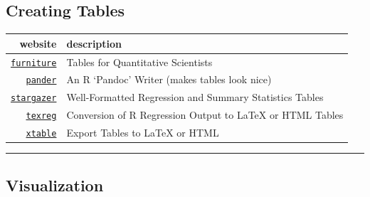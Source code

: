 \documentclass[]{book}
\theoremstyle{definition}
\theoremstyle{definition}
\theoremstyle{definition}
\theoremstyle{remark}
\begin{document}
\subsection{Creating Tables}\label{creating-tables}

\begin{longtable}[]{@{}rl@{}}
\toprule
website & description\tabularnewline
\midrule
\endhead
\href{http://tysonbarrett.com/furniture/}{\texttt{furniture}} & Tables
for Quantitative Scientists\tabularnewline
\href{https://rapporter.github.io/pander/}{\texttt{pander}} & An R
`Pandoc' Writer (makes tables look nice)\tabularnewline
\href{https://www.jakeruss.com/cheatsheets/stargazer/}{\texttt{stargazer}}
& Well-Formatted Regression and Summary Statistics Tables\tabularnewline
\href{https://diffuseprior.wordpress.com/2013/01/20/texreg-a-package-for-beautiful-and-easily-customizable-latex-regression-tables-from-r/}{\texttt{texreg}}
& Conversion of R Regression Output to LaTeX or HTML
Tables\tabularnewline
\href{https://cran.r-project.org/web/packages/xtable/vignettes/xtableGallery.pdf}{\texttt{xtable}}
& Export Tables to LaTeX or HTML\tabularnewline
\bottomrule
\end{longtable}

\begin{center}\rule{0.5\linewidth}{\linethickness}\end{center}

\subsection{Visualization}\label{visualization}
\end{document}
